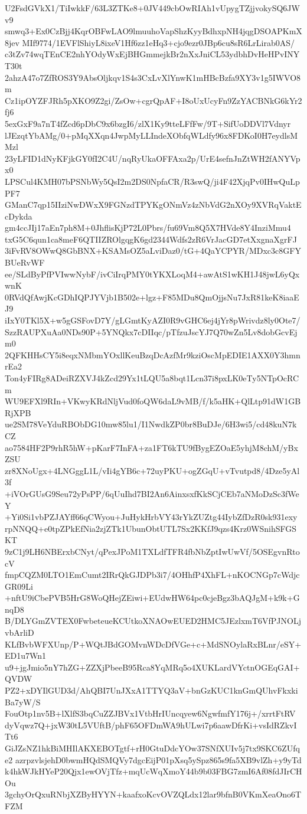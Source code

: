U2FsdGVkX1/TiIwkkF/63L3ZTKe8+0JV449cbOwRIAh1vUpygTZjjvokySQ6JWv9
smwq3+Ex0CzBjj4KqrOBFwLAO9lmuuhoVapShzKyyBdhxpNH4jqgDSOAPKmX8jev
MIf9774/1EVFlShiyL8ixeV1Hf6zz1eHq3+cjo9ezr0JBp6cu8sR6LrLirab0AS/
c3tZv74wqTEnCE2nhYOdyWxEjBHGmmejkBr2nXxJniCL53ydbhDvHeHPvINYT30t
2ahzA47o7ZfROS3Y9AbsOljkqv1S4s3CxLvXlYnwK1mHBcBzfa9XY3v1g5IWVO8m
Cz1ipOYZFJRh5pXKO9Z2gi/ZsOw+cgrQpAF+I8oUxUcyFn9ZzYACBNkG6kYr2fj6
5exGxF9a7nT4fZcd6pDbC9x6bzgI6/zlX1Ky9tteLFfFw/9T+SifUoDDVl7Vdnyr
lJEzqtYbAMg/0+pMqXXqn4JwpMyLLIndeXObfqWLdfy96x8FDKoI0H7eydlsMMzl
23yLFID1dNyKFjkGY0fI2C4U/nqRyUkaOFFAxa2p/UrE4sefnJnZtWH2fANYVpx0
LPSCul4KMH07bPSNbWy5QsI2m2DS0NpfaCR/R3swQ/ji4F42XjqPv0IHwQuLpPF7
GManC7qp15IIziNwDWxX9FGNzdTPYKgONmVz4zNbVdG2nXOy9XVRqVaktEcDykda
gm4ccJIj17aEn7ph8M+0JhflisKjP72L0Pbrs/fu69Vm8Q5X7HVde8Y4InziMmu4
txG5C6qun1ca8meF6QTIIZROlgqgK6gd2344Wdfs2zR6VrJacGD7etXxgnaXgrFJ
3iFvRV8OWwQ8GbBNX+KSAMsOZ5aLviDaz0/tG+4QaYCPYR/MDxc3c8GFYBUeRvWF
ee/SLdByPfPVIwwNybF/ivCiIrqPMY0tYKXLoqM4+awAtS1wKH1J48jwL6yQxwnK
0RVdQfAwjKcGDhIQPJYVjb1B502e+lgz+F85MDu8QmOjjsNu7JxR81keK8iaaEJ9
iIxY0TKl5X+w5gGSFovD7Y/gLGmtKyAZI0R9vGHC6ej4jYr8pWrivdz8ly0Ote7/
SzzRAUPXuAa0NDs90P+5YNQkx7cDIIqc/pTfzuJscYJ7Q70wZn5Lv8dobGcvEjm0
2QFKHHsCY5i8eqxNMbmYOxllKeuBzqDcAzfMr9kziOscMpEDIE1AXX0Y3hmnrEa2
Ton4yFIRg8ADeiRZXVJ4kZcd29Yx1tLQU5a8bqt1Lcn37i8pxLK0eTy5NTpOcRCm
WU9EFXl9RIn+VKwyKRdNljVud0foQW6daL9vMB/f/k5aHK+QlLtp91dW1GBRjXPB
ue2SM78VeYduRBObDG10mw85lu1/I1NwdkZP0br8BuDJe/6H3wi5/cd48kuN7kCZ
ao7584HF2P9rhR5hW+pKarF7InFA+za1FT6kTU9fBygEZOaE5yhjM8chM/yBxZSU
zr8XNoUgx+4LNGggL1L/vIi4gYB6c+72uyPKU+ogZGqU+vTvutpd8/4Dze5yAl3f
+iVOrGUsG9Seu72yPsPP/6qUuIhd7BI2An6AinxsxfKkSCjCEb7aNMoDzSc3fWeY
+Yi0Si1vbPZJAYff66qCWyou+JuHykHrbVY43rYkZUZtg44IybZfDzR0sk931exy
rpNNQQ+e0tpZPkEfNia2zjZTk1UbunObtUTL7Sx2KKfJ9qzs4Krz0WSnihSFGSKT
9zC1j9LH6NBErxbCNyt/qPexJPoM1TXLdfTFR4fbNbZptIwUwVf/5OSEgvnRtocV
fmpCQZM0LTO1EmCumt2IRrQkGJDPb3i7/4OHhfP4XhFL+nKOCNGp7cWdjcGR09Li
+nftU9iCbePVB5HrG8WoQHejZEiwi+EUdwHW64pc0cjeBgz3bAQJgM+k9k+GnqD8
B/DLYGmZVTEX0FwbeteueKCUtkoXNAOwEUED2HMC5JEzlxmT6VfPJNOLjvbArliD
KLfBvbWFXUnp/P+WQtJBdGOMvnWDcDfVGe+c+MdSNOylaRxBLnr/eSY+ED1u7Wn1
u9+jgJmio5nY7hZG+ZZXjPbeeB95Rca8YqMRq5o4XUKLardVYctnOGEqGAI+QVDW
PZ2+xDYIlGUD3d/AhQBI7UnJXxA1TTYQ3aV+bnGzKUC1knGmQUhvFkxkiBa7yW/S
FouOtp1nv5B+lXlfS3bqCuZZJBVx1VtbHrIUncqyew6NgwfmfY176j+/xrrtFtRV
dyVqwz7Q+jxW30tL5VUftB/phF65OFDmWA9hULwi7p6aawDfrKi+vsIdRZkvITt6
GiJZsNZ1hkBiMHIlAKXEBOTgtf+rH0GtuDdcYOw37SNfXUIv5j7tx9SKC6ZUfqe2
azrpzvlsjehD0bwmHQdSMQVy7dgcEijP01pXsq5ySpz865s9fa5XB9vlZh+y9yTd
k4hkWJkHYeP20Qjx1ewOVjTfz+mqUcWqXmoY44b9b03FBG7zmI6Af08fdJIrCHOu
3gchyOrQxuRNbjXZByHYYN+kaafxoKcvOVZQLdx12lar9bfnB0VKmXeaOno6TFZM
